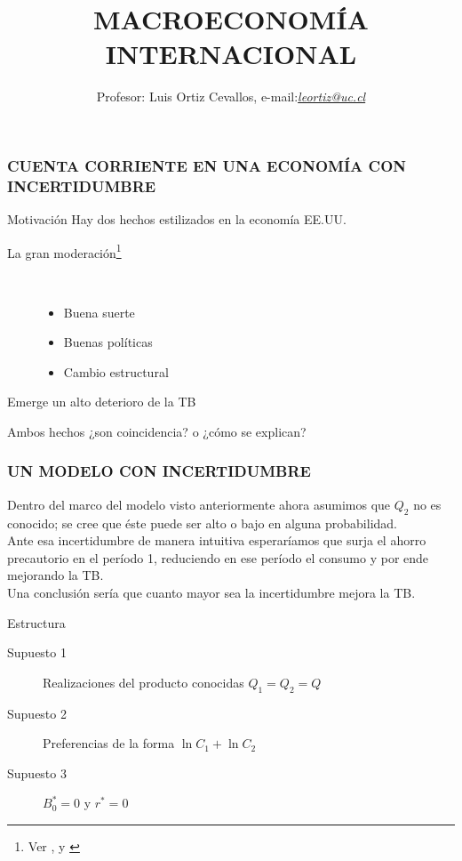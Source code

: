 \documentclass[10pt, xcolor=table, x11names]{beamer}
\author[Luis Ortiz Cevallos e-mail: \href{leortiz@uc.cl}{\textit{leortiz@uc.cl}}]{Profesor: Luis Ortiz Cevallos, e-mail:\href{leortiz@uc.cl}{\textit{leortiz@uc.cl}} }
\title[MACRO INTERNACIONAL]{\vspace*{1.0em} MACROECONOMÍA INTERNACIONAL}
\date[\href{https://ortiz-cevallos.github.io/luisortiz.github.io/ }{\textit{https://ortiz-cevallos.github.io/luisortiz.github.io/}}]{}
\begin{document}
\begin{frame}
\titlepage
\end{frame}


\begin{frame}[label=1]
	\frametitle{{\normalsize CUENTA CORRIENTE EN UNA ECONOMÍA CON INCERTIDUMBRE } {}}
	\begin{block} {Motivación}
	Hay dos hechos estilizados en la economía EE.UU.
	\begin{description}
		\item[La gran moderación\footnote{Ver \cite{Quiros2000}, \cite{Kim1999} y \cite{Stock2002}}] \\
		
		\begin{itemize}
			\\
			\item Buena suerte
			\item Buenas políticas
			\item Cambio estructural 
		\end{itemize}
		 \item[Emerge un alto deterioro de la TB] 
	\end{description}	
	\end{block}	
	Ambos hechos ¿son coincidencia? o ¿cómo se explican? 
\end{frame}

\begin{frame}[label=2]
	\frametitle{{\normalsize UN MODELO CON INCERTIDUMBRE} {}}
	Dentro del marco del modelo visto anteriormente ahora asumimos que $Q_{2} $ no es conocido; se cree que éste puede ser alto o bajo en alguna probabilidad. \\
	
	Ante esa incertidumbre de manera intuitiva esperaríamos que surja el ahorro precautorio en el período 1, reduciendo en ese período el consumo y por ende mejorando la TB.\\
	
	Una conclusión sería que cuanto mayor sea la incertidumbre mejora la TB.   
	
	\begin{block} {Estructura}
		\begin{description}
			\item[Supuesto 1] Realizaciones del producto conocidas $Q_{1}=Q_{2}=Q $
			\item[Supuesto 2] Preferencias de la forma $ \ln{C_{1}}+ \ln{C_{2}}$ 
			\item[Supuesto 3] $ B_{0}^{*}=0$ y  $ r^{*}=0$ 
	\end{description}
	\end{block}	
\end{frame}
\end{document}

